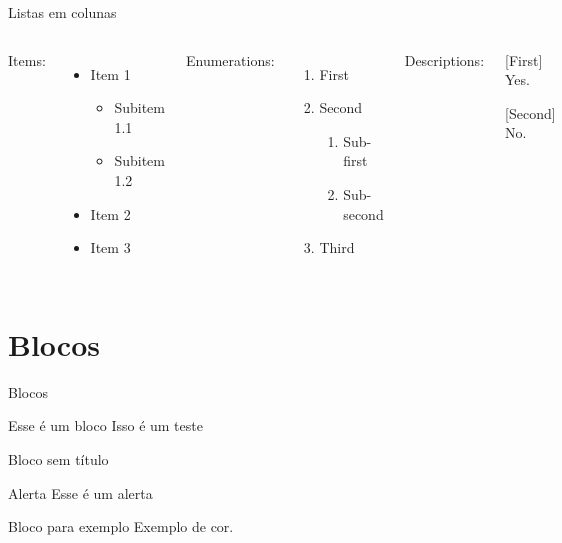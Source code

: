 \documentclass{beamer}
\let\olditem\item
\renewcommand{\item}{%
\olditem\vspace{\fill}}
\begin{document}
    \begin{frame}{Listas em colunas}
        \begin{columns}[t, onlytextwidth]
                Items:
                \begin{itemize}
                    \item Item 1
                    \begin{itemize}
                        \item Subitem 1.1
                        \item Subitem 1.2
                    \end{itemize}
                    \item Item 2
                    \item Item 3
                \end{itemize}
            
                Enumerations:
                \begin{enumerate}
                    \item First
                    \item Second
                    \begin{enumerate}
                        \item Sub-first
                        \item Sub-second
                    \end{enumerate}
                    \item Third
                \end{enumerate}
            
                Descriptions:
                \begin{description}
                    \item[First] Yes.
                    \item[Second] No.
                \end{description}
        \end{columns}
    \end{frame}


\section{Blocos}


\begin{frame}{Blocos}
	\begin{block}{Esse é um bloco}
		Isso é um teste
	\end{block}
	\begin{block}{}
	Bloco sem título	
	\end{block}
	\begin{alertblock}{Alerta}
		Esse é um alerta
	\end{alertblock}
	\begin{exampleblock}{Bloco para exemplo}
            Exemplo de \textcolor{example}{cor}.
        \end{exampleblock}
\end{frame}
\end{document}
